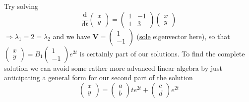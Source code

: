 \documentclass[12pt]{report}
\theoremstyle{definition}
\begin{document}
\begin{ex}
\begin{enumerate}[label = (\roman*)]
            Try solving
            \begin{equation}\label{eqn:8}
                \frac{\mathrm{d}}{\mathrm{d}t} \begin{pmatrix}
                        x \\
                        y
                \end{pmatrix} = \begin{pmatrix}
                1 & -1 \\
                1 & 3
                \end{pmatrix} \begin{pmatrix}
                        x \\
                        y
                \end{pmatrix} 
            \end{equation}
            $\Rightarrow{}\lambda_1 = 2 = \lambda_2$ and we have $\mathbf{V} = \begin{pmatrix}
                    1 \\
                    -1
                \end{pmatrix}$ (\underline{sole} eigenvector here),
                so that $\begin{pmatrix}
                        x \\
                        y
                \end{pmatrix} = B_1 \begin{pmatrix}
                        1 \\
                        -1
                \end{pmatrix} e^{2t}$ is certainly part of our solutions.
                To find the complete solution we can avoid some rather more
                advanced linear algebra by just anticipating a general form 
                for our second part of the solution\[
                    \begin{pmatrix}
                            x \\
                            y
                    \end{pmatrix} = \begin{pmatrix}
                            a \\
                            b
                    \end{pmatrix} t e^{2t} + \begin{pmatrix}
                            c \\
                            d
                    \end{pmatrix} e^{2t}
\]
\end{enumerate}
\end{ex}
\end{document}
